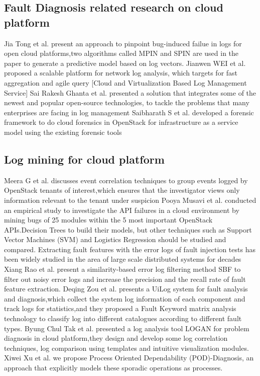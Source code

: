 \subsection{Fault Diagnosis related research on cloud platform}
Jia Tong et al.\cite{tong2016approach} present an approach to pinpoint bug-induced failue in logs for open cloud platforms,two algorithms called MPIN and SPIN are used in the paper to generate a predictive model based on log vectors.
Jianwen WEI et al.\cite{wei2011analysis} proposed a scalable platform for network log analysis, which targets for fast aggregation and agile query
[Cloud and Virtualization Based Log Management Service]
Sai Rakesh Ghanta et al.\cite{ghanta2017cloud} presented a solution that integrates some of the newest and popular open-source technologies, to tackle the problems that many enterprises are facing in log management
Saibharath S et al.\cite{saibharath2014design} developed a forensic framework to do cloud forensics in OpenStack for infrastructure
as a service model using the existing forensic tools
\subsection{Log mining for cloud platform}
Meera G et al.\cite{meera2016event} discusses event correlation techniques to group events logged by OpenStack tenants of interest,which ensures that the investigator views only information relevant to the tenant under suspicion
Pooya Musavi et al.\cite{Musavi2016Reliabiligy} conducted an empirical study to investigate the API failures in a cloud environment by mining bugs of 25 modules within the 5 most important OpenStack APIs.Decision Trees to build their models, but other techniques such as Support Vector Machines (SVM) and Logistics Regression should be studied and compared.
Extracting fault features with the error logs of fault injection tests has been widely studied in the area of large scale distributed systems for decades
Xiang Rao et al.\cite{rao2011identifying} present a similarity-based error log filtering method SBF to filter out noisy error logs and  increase the precision and the recall rate of fault feature extraction.
Deqing Zou et al.\cite{zou2014improving} presents a UiLog system for fault analysis and diagnosis,which collect the system log information of each component and track logs for statistics,and they proposed a Fault Keyword matrix analysis technology to classify log into different catalogues according to different fault types.
Byung Chul Tak et al.\cite{tak2016logan} presented a log analysis tool LOGAN for problem diagnosis in cloud platform,they design and develop some log correlation techniques, log comparison using templates and intuitive visualization modules.
Xiwei Xu et al.\cite{xu2014pod} we propose Process Oriented Dependability (POD)-Diagnosis, an approach that explicitly models these sporadic operations as processes. 
